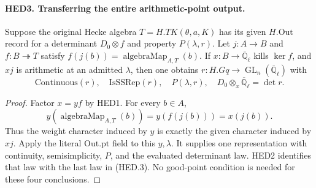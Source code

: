 \paragraph{HED3. Transferring the entire arithmetic-point output.}
\label{claim:HED3}
Suppose the original Hecke algebra \(T=H.TK(\theta,a,K)\) has its
given \(H.\mathrm{Out}\) record for a determinant \(D_0\otimes f\)
and property \(P(\lambda,r)\).  Let \(j:A\to B\) and
\(f:B\twoheadrightarrow T\) satisfy
\(f(j(b))=\operatorname{algebraMap}_{A,T}(b)\).
If \(x:B\to\overline{\mathbb Q}_\ell\) kills \(\ker f\), and
\(xj\) is arithmetic at an admitted \(\lambda\), then one obtains
\(r:H.Gq\to\operatorname{GL}_n(\overline{\mathbb Q}_\ell)\) with
\[
 \mathrm{Continuous}(r),\quad \mathrm{IsSSRep}(r),\quad
 P(\lambda,r),\quad D_0\otimes_x\overline{\mathbb Q}_\ell=\det r.
 \tag{HED.3}
\]
\begin{proof}
Factor \(x=yf\) by HED1.  For every \(b\in A\),
\[
 y(\operatorname{algebraMap}_{A,T}(b))=y(f(j(b)))=x(j(b)).
\]
Thus the weight character induced by \(y\) is exactly the given
character induced by \(xj\).  Apply the literal \(\mathrm{Out.pt}\)
field to this \(y,\lambda\).  It supplies one representation with
continuity, semisimplicity, \(P\), and the evaluated determinant law.
HED2 identifies that law with the last law in (HED.3).
No good-point condition is needed for these four conclusions.
\end{proof}

